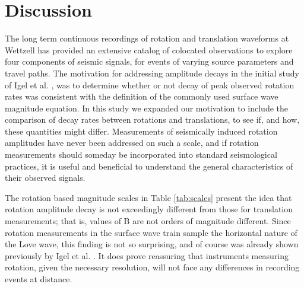 \documentclass{gji}
\begin{document}


\section{Discussion}
The long term continuous recordings of rotation and translation waveforms at Wettzell has provided an extensive catalog of colocated observations to explore four components of seismic signals, for events of varying source parameters and travel paths. The motivation for addressing amplitude decays in the initial study of Igel et al. , was to determine whether or not decay of peak observed rotation rates was consistent with the definition of the commonly used surface wave magnitude equation. In this study we expanded our motivation to include the comparison of decay rates between rotations and translations, to see if, and how, these quantities might differ. Measurements of seismically induced rotation amplitudes have never been addressed on such a scale, and  if rotation measurements should someday be incorporated into standard seismological practices, it is useful and beneficial to understand the general characteristics of their observed signals.

The rotation based magnitude scales in Table \ref{tab:scales} present the idea that rotation amplitude decay is not exceedingly different from those for translation measurements; that is, values of B are not orders of magnitude different. Since rotation measurements in the surface wave train sample the horizontal nature of the Love wave, this finding is not so surprising, and of course was already shown previously by Igel et al. . It does prove reassuring that instruments measuring rotation, given the necessary resolution, will not face any differences in recording events at distance.
\end{document}
